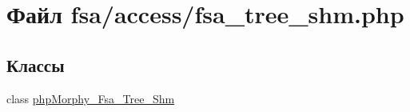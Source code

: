 \hypertarget{fsa__tree__shm_8php}{
\section{Файл fsa/access/fsa\_\-tree\_\-shm.php}
\label{fsa__tree__shm_8php}
}
\subsection*{Классы}
\begin{DoxyCompactItemize}
\item 
class \hyperlink{classphpMorphy__Fsa__Tree__Shm}{phpMorphy\_\-Fsa\_\-Tree\_\-Shm}
\end{DoxyCompactItemize}
